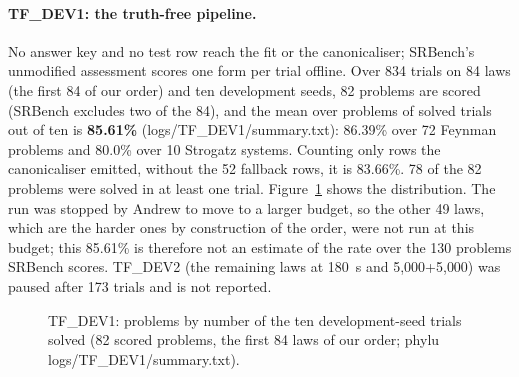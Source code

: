 \documentclass[sigconf,nonacm]{acmart}
\newcommand{\src}[1]{{\small\ttfamily #1}}
\begin{document}
\paragraph{TF\_DEV1: the truth-free pipeline.} No answer key and no test row
reach the fit or the canonicaliser; SRBench's unmodified assessment scores one
form per trial offline. Over 834 trials on 84 laws (the first 84 of our order)
and ten development seeds, 82 problems are scored (SRBench excludes two of the
84), and the mean over problems of solved trials out of ten is \textbf{85.61\%}
(\src{logs/\allowbreak{}TF\_\allowbreak{}DEV1/\allowbreak{}summary.\allowbreak{}txt}): 86.39\% over 72 Feynman problems and 80.0\%
over 10 Strogatz systems. Counting only rows the canonicaliser emitted, without
the 52 fallback rows, it is 83.66\%. 78 of the 82 problems were solved in at
least one trial. Figure~\ref{fig:tfdev1} shows the distribution. The run was
stopped by Andrew to move to a larger budget, so the other 49 laws, which are
the harder ones by construction of the order, were not run at this budget; this
85.61\% is therefore not an estimate of the rate over the 130 problems SRBench
scores. TF\_DEV2 (the remaining laws at 180~s and 5{,}000+5{,}000) was paused
after 173 trials and is not reported.

\begin{figure}[t]
\centering
{}
\caption{TF\_DEV1: problems by number of the ten development-seed trials solved
(82 scored problems, the first 84 laws of our order;
\src{phylu logs/\allowbreak{}TF\_\allowbreak{}DEV1/\allowbreak{}summary.\allowbreak{}txt}).}
\label{fig:tfdev1}
\end{figure}
\end{document}
